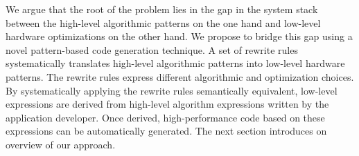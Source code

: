 \bigskip

We argue that the root of the problem lies in the gap in the system stack between the high-level algorithmic patterns on the one hand and low-level hardware optimizations on the other hand.
We propose to bridge this gap using a novel pattern-based code generation technique.
A set of rewrite rules systematically translates high-level algorithmic patterns into low-level hardware patterns.
The rewrite rules express different algorithmic and optimization choices.
By systematically applying the rewrite rules semantically equivalent, low-level expressions are derived from high-level algorithm expressions written by the application developer.
Once derived, high-performance code based on these expressions can be automatically generated.
The next section introduces on overview of our approach.

